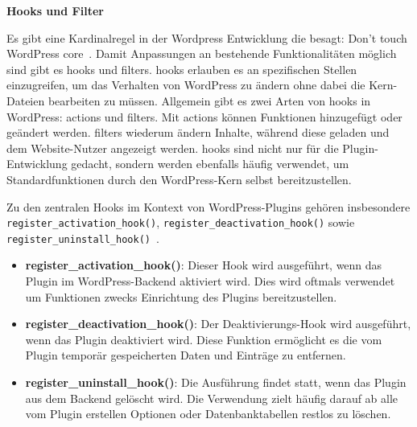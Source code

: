\newpage
\textbf{Hooks und Filter}

Es gibt eine Kardinalregel in der Wordpress Entwicklung die besagt: Don’t touch WordPress core~\cite{wordpress2024Intro}.
Damit Anpassungen an bestehende Funktionalitäten möglich sind gibt es \glspl{hook} und \glspl{filter}.
\glspl{hook} erlauben es an spezifischen Stellen einzugreifen, um das Verhalten von WordPress zu ändern ohne dabei die Kern-Dateien bearbeiten zu müssen.
Allgemein gibt es zwei Arten von \glspl{hook} in WordPress: \glspl{action} und \glspl{filter}.
Mit \glspl{action} können Funktionen hinzugefügt oder geändert werden.
\glspl{filter} wiederum ändern Inhalte, während diese geladen und dem Website-Nutzer angezeigt werden.
\glspl{hook} sind nicht nur für die Plugin-Entwicklung gedacht, sondern werden ebenfalls häufig verwendet, um Standardfunktionen durch den WordPress-Kern selbst bereitzustellen.

Zu den zentralen Hooks im Kontext von WordPress-Plugins gehören insbesondere \texttt{register\_activation\_hook()}, \texttt{register\_deactivation\_hook()} sowie \\ \texttt{register\_uninstall\_hook()}~\cite{wordpress2024ActionsHooks}.

\begin{itemize}
 \item \textbf{register\_activation\_hook()}: Dieser Hook wird ausgeführt, wenn das Plugin im WordPress-Backend aktiviert wird. Dies wird oftmals verwendet um Funktionen zwecks Einrichtung des Plugins bereitzustellen.
 \item \textbf{register\_deactivation\_hook()}: Der Deaktivierungs-Hook wird ausgeführt, wenn das Plugin deaktiviert wird. Diese Funktion ermöglicht es die vom Plugin temporär gespeicherten Daten und Einträge zu entfernen.
 \item \textbf{register\_uninstall\_hook()}: Die Ausführung findet statt, wenn das Plugin aus dem Backend gelöscht wird. Die Verwendung zielt häufig darauf ab alle vom Plugin erstellen Optionen oder Datenbanktabellen restlos zu löschen.
\end{itemize}






